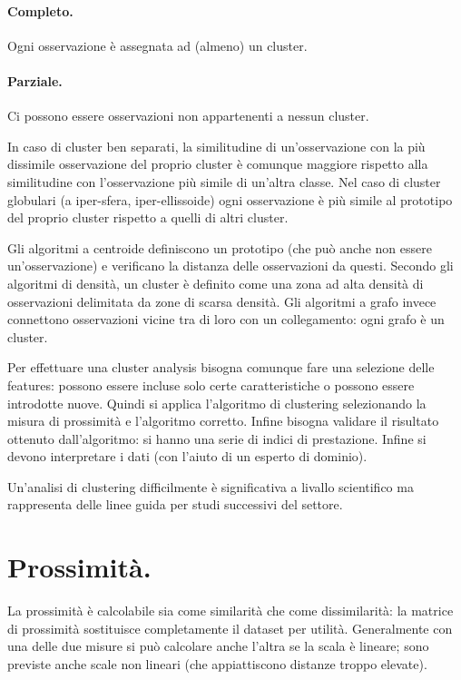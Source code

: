 \documentclass[11pt, a4page, twocolumn]{article}
\begin{document}
\paragraph{Completo.}
Ogni osservazione è assegnata ad (almeno) un cluster.
\paragraph{Parziale.}
Ci possono essere osservazioni non appartenenti a nessun cluster. \newline

In caso di cluster ben separati, la similitudine di un'osservazione con la più dissimile osservazione del proprio cluster è comunque maggiore rispetto alla similitudine con l'osservazione più simile di un'altra classe.
Nel caso di cluster globulari (a iper-sfera, iper-ellissoide) ogni osservazione è più simile al prototipo del proprio cluster rispetto a quelli di altri cluster.

Gli algoritmi a centroide definiscono un prototipo (che può anche non essere un'osservazione) e verificano la distanza delle osservazioni da questi.
Secondo gli algoritmi di densità, un cluster è definito come una zona ad alta densità di osservazioni delimitata da zone di scarsa densità.
Gli algoritmi a grafo invece connettono osservazioni vicine tra di loro con un collegamento: ogni grafo è un cluster. \newline

Per effettuare una cluster analysis bisogna comunque fare una selezione delle features: possono essere incluse solo certe caratteristiche o possono essere introdotte nuove.
Quindi si applica l'algoritmo di clustering selezionando la misura di prossimità e l'algoritmo corretto.
Infine bisogna validare il risultato ottenuto dall'algoritmo: si hanno una serie di indici di prestazione.
Infine si devono interpretare i dati (con l'aiuto di un esperto di dominio).

Un'analisi di clustering difficilmente è significativa a livallo scientifico ma rappresenta delle linee guida per studi successivi del settore.

\section{Prossimità.}
La prossimità è calcolabile sia come similarità che come dissimilarità: la matrice di prossimità sostituisce completamente il dataset per utilità.
Generalmente con una delle due misure si può calcolare anche l'altra se la scala è lineare; sono previste anche scale non lineari (che appiattiscono distanze troppo elevate).
\end{document}
